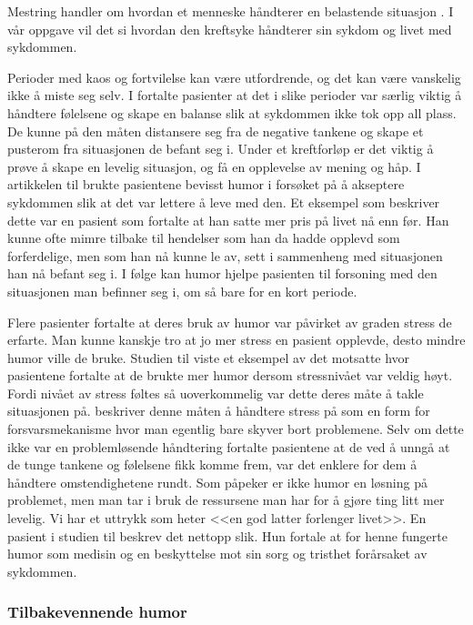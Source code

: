 Mestring handler om hvordan et menneske håndterer en belastende situasjon
\cite{reitan2006}. I vår oppgave vil det si hvordan den kreftsyke håndterer sin
sykdom og livet med sykdommen.

Perioder med kaos og fortvilelse kan være utfordrende, og det kan være
vanskelig ikke å miste seg selv. I  fortalte pasienter at
det i slike perioder var særlig viktig å håndtere følelsene og skape en balanse
slik at sykdommen ikke tok opp all plass. De kunne på den måten distansere seg
fra de negative tankene og skape et pusterom fra situasjonen de befant seg i.
Under et kreftforløp er det viktig å prøve å skape en levelig situasjon, og få
en opplevelse av mening og håp. I artikkelen til  brukte
pasientene bevisst humor i forsøket på å akseptere sykdommen slik at det var
lettere å leve med den. Et eksempel som beskriver dette var en pasient som
fortalte at han satte mer pris på livet nå enn før. Han kunne ofte mimre
tilbake til hendelser som han da hadde opplevd som forferdelige, men som han nå
kunne le av, sett i sammenheng med situasjonen han nå befant seg i. I følge
 kan humor hjelpe pasienten til forsoning med den situasjonen
man befinner seg i, om så bare for en kort periode.

Flere pasienter fortalte at deres bruk av humor var påvirket av graden stress
de erfarte. Man kunne kanskje tro at jo mer stress en pasient opplevde, desto
mindre humor ville de bruke. Studien til  viste et eksempel
av det motsatte hvor pasientene fortalte at de brukte mer humor dersom
stressnivået var veldig høyt. Fordi nivået av stress føltes så uoverkommelig
var dette deres måte å takle situasjonen på.  beskriver denne
måten å håndtere stress på som en form for forsvarsmekanisme hvor man egentlig
bare skyver bort problemene. Selv om dette ikke var en problemløsende
håndtering fortalte pasientene at de ved å unngå at de tunge tankene og
følelsene fikk komme frem, var det enklere for dem å håndtere omstendighetene
rundt. Som  påpeker er ikke humor en løsning på problemet,
men man tar i bruk de ressursene man har for å gjøre ting litt mer levelig. Vi
har et uttrykk som heter <<en god latter forlenger livet>>. En pasient i
studien til  beskrev det nettopp slik. Hun fortale at for
henne fungerte humor som medisin og en beskyttelse mot sin sorg og tristhet
forårsaket av sykdommen.

\subsubsection{Tilbakevennende humor}

